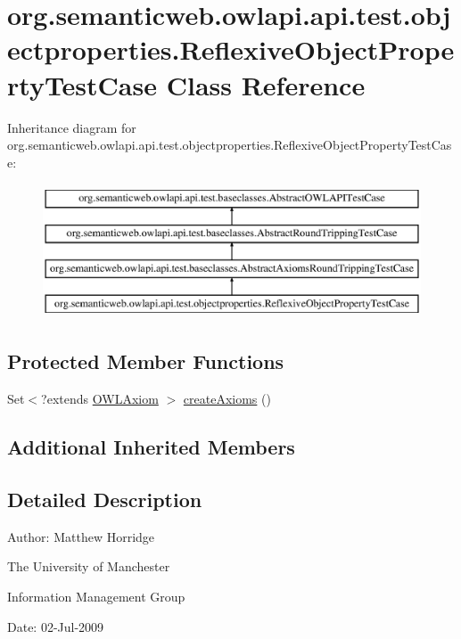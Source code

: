 \hypertarget{classorg_1_1semanticweb_1_1owlapi_1_1api_1_1test_1_1objectproperties_1_1_reflexive_object_property_test_case}{\section{org.\-semanticweb.\-owlapi.\-api.\-test.\-objectproperties.\-Reflexive\-Object\-Property\-Test\-Case Class Reference}
\label{classorg_1_1semanticweb_1_1owlapi_1_1api_1_1test_1_1objectproperties_1_1_reflexive_object_property_test_case}
}
Inheritance diagram for org.\-semanticweb.\-owlapi.\-api.\-test.\-objectproperties.\-Reflexive\-Object\-Property\-Test\-Case\-:\begin{figure}[H]
\begin{center}
\leavevmode
\includegraphics[height=4.000000cm]{classorg_1_1semanticweb_1_1owlapi_1_1api_1_1test_1_1objectproperties_1_1_reflexive_object_property_test_case}
\end{center}
\end{figure}
\subsection*{Protected Member Functions}
\begin{DoxyCompactItemize}
\item 
Set$<$?extends \hyperlink{interfaceorg_1_1semanticweb_1_1owlapi_1_1model_1_1_o_w_l_axiom}{O\-W\-L\-Axiom} $>$ \hyperlink{classorg_1_1semanticweb_1_1owlapi_1_1api_1_1test_1_1objectproperties_1_1_reflexive_object_property_test_case_a75bb0fae9062c1e9c04bb6ce24f107c8}{create\-Axioms} ()
\end{DoxyCompactItemize}
\subsection*{Additional Inherited Members}


\subsection{Detailed Description}
Author\-: Matthew Horridge\par
 The University of Manchester\par
 Information Management Group\par
 Date\-: 02-\/\-Jul-\/2009 


